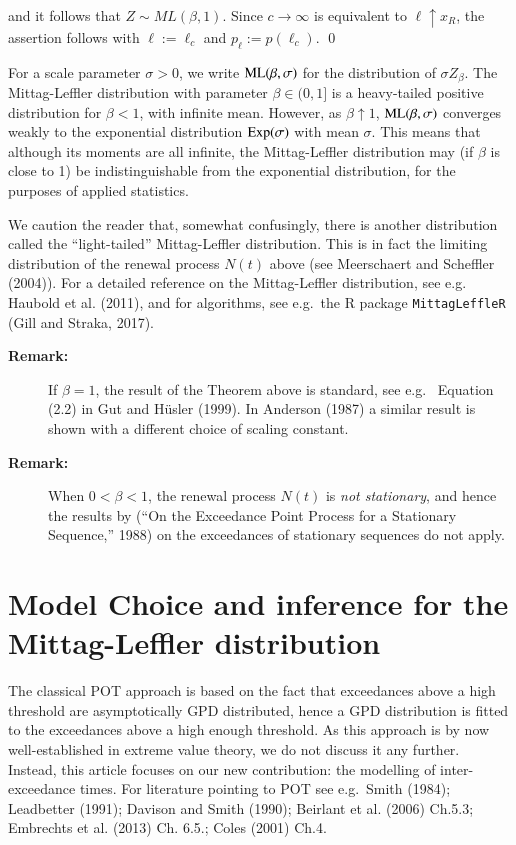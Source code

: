 \documentclass[]{elsarticle} %
\begin{document}
and it follows that \(Z \sim ML(\beta,1)\). Since
\(c \rightarrow \infty\) is equivalent to \(\ell \uparrow x_R\), the
assertion follows with \(\ell:=\ell_c\) and \(p_\ell:=p(\ell_c)\). \qed

For a scale parameter \(\sigma > 0\), we write
\({\rm ML}(\beta, \sigma)\) for the distribution of \(\sigma Z_\beta\).
The Mittag-Leffler distribution with parameter \(\beta \in (0,1]\) is a
heavy-tailed positive distribution for \(\beta < 1\), with infinite
mean. However, as \(\beta \uparrow 1\), \({\rm ML}(\beta, \sigma)\)
converges weakly to the exponential distribution \({\rm Exp}(\sigma)\)
with mean \(\sigma\). This means that although its moments are all
infinite, the Mittag-Leffler distribution may (if \(\beta\) is close to
1) be indistinguishable from the exponential distribution, for the
purposes of applied statistics.

We caution the reader that, somewhat confusingly, there is another
distribution called the ``light-tailed'' Mittag-Leffler distribution.
This is in fact the limiting distribution of the renewal process
\(N(t)\) above (see Meerschaert and Scheffler (2004)). For a detailed
reference on the Mittag-Leffler distribution, see e.g.~ Haubold et al.
(2011), and for algorithms, see e.g.~the R package
\texttt{MittagLeffleR} (Gill and Straka, 2017).

\begin{description}
\item[\textbf{Remark:}]
If \(\beta = 1\), the result of the Theorem above is standard, see e.g.~
Equation (2.2) in Gut and Hüsler (1999). In Anderson (1987) a similar
result is shown with a different choice of scaling constant.
\item[\textbf{Remark:}]
When \(0 < \beta < 1\), the renewal process \(N(t)\) is \emph{not
stationary}, and hence the results by (``On the Exceedance Point Process
for a Stationary Sequence,'' 1988) on the exceedances of stationary
sequences do not apply.
\end{description}

\hypertarget{sec:ML}{%
\section{Model Choice and inference for the Mittag-Leffler
distribution}\label{sec:ML}}

The classical POT approach is based on the fact that exceedances above a
high threshold are asymptotically GPD distributed, hence a GPD
distribution is fitted to the exceedances above a high enough threshold.
As this approach is by now well-established in extreme value theory, we
do not discuss it any further. Instead, this article focuses on our new
contribution: the modelling of inter-exceedance times. For literature
pointing to POT see e.g.~Smith (1984); Leadbetter (1991); Davison and
Smith (1990); Beirlant et al. (2006) Ch.5.3; Embrechts et al. (2013) Ch.
6.5.; Coles (2001) Ch.4.
\end{document}
